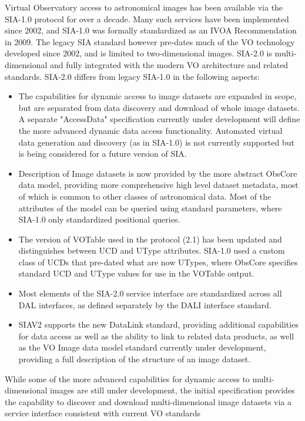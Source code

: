 \documentclass[11pt,a4paper]{ivoa}
\begin{document}
Virtual Observatory access to astronomical images has been available via the SIA-1.0 protocol for over a decade.  Many such services have been implemented since 2002, and SIA-1.0 \citep{std:SIAP} was formally standardized as an IVOA Recommendation in 2009.  The legacy SIA standard however pre-dates much of the VO technology developed since 2002, and is limited to two-dimensional images.  SIA-2.0 is multi-dimensional and fully integrated with the modern VO architecture and related standards.
SIA-2.0 differs from legacy SIA-1.0 in the following aspects:
\begin{itemize}
    \item The capabilities for dynamic access to image datasets are expanded in scope, but are separated from data discovery and download of whole image datasets.  A separate "AccessData" specification currently under development will define the more advanced dynamic data access functionality.  Automated virtual data generation and discovery (as in SIA-1.0) is not currently supported but is being considered for a future version of SIA.
    \item Description of Image datasets is now provided by the more abstract ObsCore data model, providing more comprehensive high level dataset metadata, most of which is common to other classes of astronomical data. Most of the attributes of the model can be queried using standard parameters, where SIA-1.0 only standardized positional queries. 
    \item The version of VOTable   used  in the protocol (2.1) has been updated  and distinguishes between UCD and UType attributes. SIA-1.0 used a custom class of UCDs that pre-dated what are now UTypes, where ObsCore specifies standard UCD and UType values for use in the VOTable output.
    \item Most elements of the SIA-2.0 service interface are standardized across all DAL interfaces, as defined separately by the DALI  interface standard.
    \item SIAV2  supports the new DataLink  standard, providing additional capabilities for data access as well as the ability to link to related data products, as well as the VO Image data model standard currently under development, providing a full description of the structure of an image dataset.
\end{itemize}
While some of the more advanced capabilities for dynamic access to multi-dimensional images are still under development, the initial specification provides the capability to discover and download multi-dimensional image datasets via a service interface consistent with current VO standards
\end{document}
